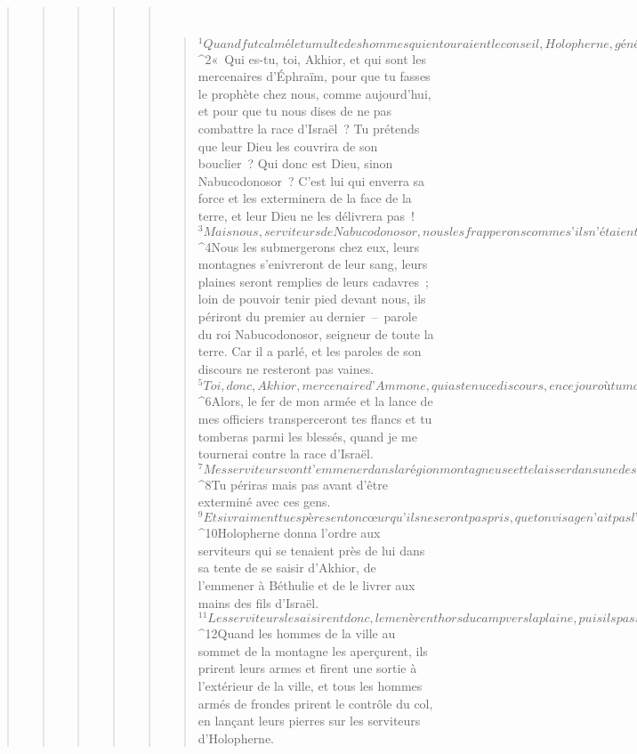 \begin{verse}
\begin{verse}
\begin{verse}
\begin{verse}
\begin{verse}
         
      \bchapter{}
      \begin{verse}
${}^{1}Quand fut calmé le tumulte des hommes qui entouraient le conseil, Holopherne, général en chef de l’armée d’Assour, dit à Akhior devant tout le peuple des tribus étrangères et tous les fils de Moab : 
${}^{2}« Qui es-tu, toi, Akhior, et qui sont les mercenaires d’Éphraïm, pour que tu fasses le prophète chez nous, comme aujourd’hui, et pour que tu nous dises de ne pas combattre la race d’Israël ? Tu prétends que leur Dieu les couvrira de son bouclier ? Qui donc est Dieu, sinon Nabucodonosor ? C’est lui qui enverra sa force et les exterminera de la face de la terre, et leur Dieu ne les délivrera pas ! 
${}^{3}Mais nous, serviteurs de Nabucodonosor, nous les frapperons comme s’ils n’étaient qu’un seul homme, et ils ne résisteront pas à la force de nos chevaux. 
${}^{4}Nous les submergerons chez eux, leurs montagnes s’enivreront de leur sang, leurs plaines seront remplies de leurs cadavres ; loin de pouvoir tenir pied devant nous, ils périront du premier au dernier – parole du roi Nabucodonosor, seigneur de toute la terre. Car il a parlé, et les paroles de son discours ne resteront pas vaines.
${}^{5}Toi, donc, Akhior, mercenaire d’Ammone, qui as tenu ce discours, en ce jour où tu manques à tes devoirs, tu ne verras plus mon visage à partir d’aujourd’hui, jusqu’à ce que j’aie châtié cette race venue d’Égypte. 
${}^{6}Alors, le fer de mon armée et la lance de mes officiers transperceront tes flancs et tu tomberas parmi les blessés, quand je me tournerai contre la race d’Israël. 
${}^{7}Mes serviteurs vont t’emmener dans la région montagneuse et te laisser dans une des villes contrôlant les cols. 
${}^{8}Tu périras mais pas avant d’être exterminé avec ces gens. 
${}^{9}Et si vraiment tu espères en ton cœur qu’ils ne seront pas pris, que ton visage n’ait pas l’air abattu ! J’ai parlé, et aucune de mes paroles ne sera sans effet. »
${}^{10}Holopherne donna l’ordre aux serviteurs qui se tenaient près de lui dans sa tente de se saisir d’Akhior, de l’emmener à Béthulie et de le livrer aux mains des fils d’Israël. 
${}^{11}Les serviteurs le saisirent donc, le menèrent hors du camp vers la plaine, puis ils passèrent d’une région à l’autre, du centre de la plaine vers la montagne, et ils parvinrent près des sources en contrebas de Béthulie.
${}^{12}Quand les hommes de la ville au sommet de la montagne les aperçurent, ils prirent leurs armes et firent une sortie à l’extérieur de la ville, et tous les hommes armés de frondes prirent le contrôle du col, en lançant leurs pierres sur les serviteurs d’Holopherne. 

\end{verse}
\end{verse}
\end{verse}
\end{verse}
\end{verse}
\end{verse}
